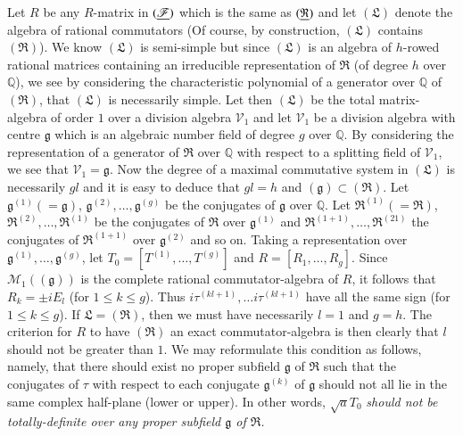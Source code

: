 Let $R$ be any $R$-matrix in $(\underline{\mathscr{F}})$ which is the same as
$(\underline{\mathfrak{R}})$ and let $(\mathfrak{L})$ denote the algebra of
rational commutators (Of course, by construction, $(\mathfrak{L})$
contains $(\mathfrak{R})$). We know $(\mathfrak{L})$ is semi-simple
but since $(\mathfrak{L})$ is an algebra of $h$-rowed rational
matrices containing an irreducible representation of $\mathfrak{R}$
(of degree $h$ over $\mathbb{Q}$), we see by considering the
characteristic polynomial of a generator over $\mathbb{Q}$ of
$(\mathfrak{R})$, that $(\mathfrak{L})$ is necessarily simple. Let
then $(\mathfrak{L})$ be the total matrix-algebra of order $1$ over a
division algebra $\mathscr{V}_{1}$ and let $\mathscr{V}_{1}$ be a
division algebra with centre $\mathfrak{g}$ which is an algebraic
number field of degree $g$ over $\mathbb{Q}$. By considering the
representation of a generator of $\mathfrak{R}$ over $\mathbb{Q}$ with
respect to a splitting field of $\mathscr{V}_{1}$, we see that
$\mathscr{V}_{1}=\mathfrak{g}$. Now the degree of a maximal
commutative system in $(\mathfrak{L})$ is necessarily $gl$ and it is
easy to deduce that $gl=h$ and $(\mathfrak{g})\subset
(\mathfrak{R})$. Let $\mathfrak{g}^{(1)}(=\mathfrak{g})$,
$\mathfrak{g}^{(2)},\ldots,\mathfrak{g}^{(g)}$ be the conjugates of
$\mathfrak{g}$ over $\mathbb{Q}$. Let
$\mathfrak{R}^{(1)}(=\mathfrak{R})$,
$\mathfrak{R}^{(2)},\ldots,\mathfrak{R}^{(1)}$ be the conjugates of
$\mathfrak{R}$ over $\mathfrak{g}^{(1)}$ and
$\mathfrak{R}^{(1+1)},\ldots,\mathfrak{R}^{(21)}$ the conjugates of
$\mathfrak{R}^{(1+1)}$ over $\mathfrak{g}^{(2)}$ and so on. Taking a
representation over $\mathfrak{g}^{(1)},\ldots,\mathfrak{g}^{(g)}$,
let $T_{0}=[T^{(1)},\ldots,T^{(g)}]$ and
$R=[R_{1},\ldots,R_{g}]$. Since $\mathscr{M}_{1}((\mathfrak{g}))$ is
the complete rational commutator-algebra of $R$, it follows that
$R_{k}=\pm iE_{l}$ (for $1\leq k\leq g$). Thus\pageoriginale
$i\tau^{(kl+1)},\ldots i\tau^{(kl+1)}$ have all the same sign (for
$1\leq k\leq g$). If $\mathfrak{L}=(\mathfrak{R})$, then we must have
necessarily $l=1$ and $g=h$. The criterion for $R$ to have
$(\mathfrak{R})$ an exact commutator-algebra is then clearly that $l$
should not be greater than $1$. We may reformulate this condition as
follows, namely, that there should exist no proper subfield
$\mathfrak{g}$ of $\mathfrak{R}$ such that the conjugates of $\tau$
with respect to each conjugate $\mathfrak{g}^{(k)}$ of $\mathfrak{g}$
should not all lie in the same complex half-plane (lower or upper). In
other words, $\sqrt{a}T_{0}$ {\em should not be totally-definite over
  any proper subfield $\mathfrak{g}$ of $\mathfrak{R}$.}

